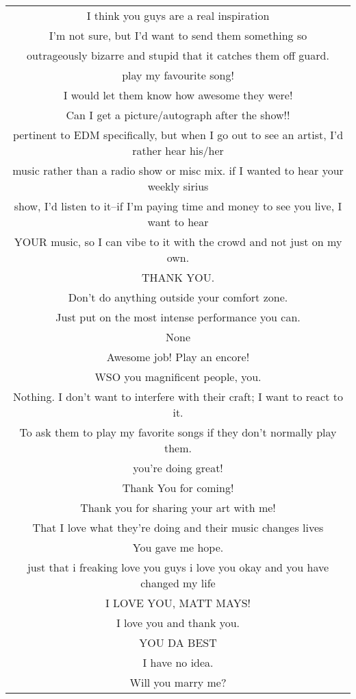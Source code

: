 \begin{center}
\begin{tabular}{|c|}
\hline
I think you guys are a real inspiration\\
I'm not sure, but I'd want to send them something so\\
outrageously bizarre and stupid that it catches them off guard.\\ \hline
play my favourite song!\\ \hline
I would let them know how awesome they were!\\ \hline
Can I get a picture/autograph after the show!!\\ \hline
pertinent to EDM specifically, but when I go out to see an artist, I'd rather hear his/her\\
music rather than a radio show or misc mix. if I wanted to hear your weekly sirius\\
show, I'd listen to it--if I'm paying time and money to see you live, I want to hear\\
YOUR music, so I can vibe to it with the crowd and not just on my own.\\ \hline
THANK YOU.\\ \hline
Don't do anything outside your comfort zone.\\
Just put on the most intense performance you can.\\ \hline
None\\ \hline
Awesome job! Play an encore!\\ \hline
WSO you magnificent people, you.\\ \hline
Nothing. I don't want to interfere with their craft; I want to react to it.\\ \hline
To ask them to play my favorite songs if they don't normally play them.\\ \hline
you're doing great!\\ \hline
Thank You for coming!\\ \hline
Thank you for sharing your art with me!\\ \hline
That I love what they're doing and their music changes lives\\ \hline
You gave me hope.\\ \hline
just that i freaking love you guys i love you okay and you have changed my life\\ \hline
I LOVE YOU, MATT MAYS!\\ \hline
I love you and thank you.\\ \hline
YOU DA BEST\\ \hline
I have no idea.\\ \hline
Will you marry me?\\
\hline
\end{tabular}


\end{center}
